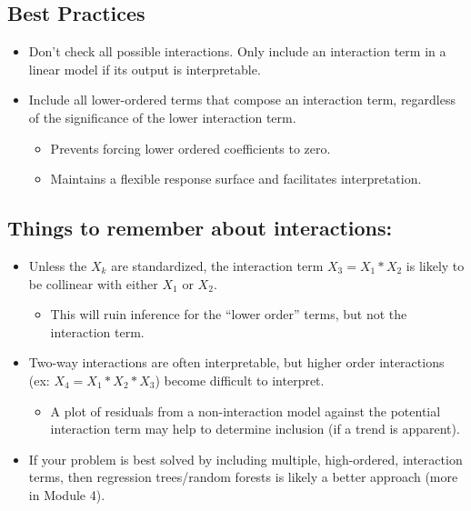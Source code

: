 \documentclass[12pt]{notes}
\begin{document}
\subsection{Best Practices}
\begin{itemize}
\item Don't check all possible interactions. Only include an interaction term in a linear model if its output is interpretable. 
\item Include all lower-ordered terms that compose an interaction term, regardless of the significance of the lower interaction term.
\begin{itemize}
\item Prevents forcing lower ordered coefficients to zero.
\item Maintains a flexible response surface and facilitates interpretation. 
\end{itemize}
\end{itemize}

\subsection{Things to remember about interactions:}
\begin{itemize}
\item Unless the $X_k$ are standardized, the interaction term $X_3 = X_1*X_2$ is likely to be collinear with either $X_1$ or $X_2$.
\begin{itemize}
\item This will ruin inference for the ``lower order'' terms, but not the interaction term.
\end{itemize}
\item Two-way interactions are often interpretable, but higher order interactions (ex: $X_4 = X_1*X_2*X_3$) become difficult to interpret.
\begin{itemize}
\item A plot of residuals from a non-interaction model against the potential interaction term may help to determine inclusion (if a trend is apparent). 
\end{itemize}
\item If your problem is best solved by including multiple, high-ordered, interaction terms, then regression trees/random forests is likely a better approach (more in Module 4). 
\end{itemize}
\end{document}
